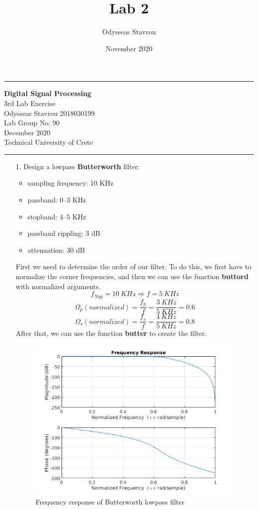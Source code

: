 \documentclass[12pt, a4paper]{article}
\title{Lab 2}
\author{Odysseas Stavrou}
\date{November 2020}
\begin{document}
\noindent\rule{\textwidth}{1.5pt}

\begin{center}
{\bf Digital Signal Processing} \\ 
 3rd Lab Exercise\\
 Odysseas Stavrou 2018030199\\
 Lab Group No: 90\\
 December 2020\\
 Technical University of Crete\\
\end{center}
\noindent\rule{\textwidth}{1.5pt}

\begin{enumerate}
    \item[1.] Design a lowpass \textbf{Butterworth} filter:
    \begin{itemize}
        \item sampling frequency: 10 KHz
        \item passband: 0--3 KHz
        \item stopband: 4--5 KHz
        \item passband rippling: 3 dB
        \item attenuation: 30 dB
    \end{itemize}
    First we need to determine the order of our filter. To do this, we first have to normalize the corner frequencies, 
    and then we can use the function \textbf{buttord} with normalized arguments.
    \[f_{Nyq} = 10\ KHz \Rightarrow f = 5\ KHz\]
    \[\Omega_p (normalized) = \frac{f_p}{f} = \frac{3\ KHz}{5\ KHz} = 0.6\]
    \[\Omega_s (normalized) = \frac{f_s}{f} = \frac{4\ KHz}{5\ KHz} = 0.8\]
    After that, we can use the function \textbf{butter} to create the filter.

    \begin{figure}[H]
        \centering
        \includegraphics[scale=0.8]{butter.png}
        \caption{Frequency response of Butterworth lowpass filter}
    \end{figure}


\end{enumerate}
\end{document}
